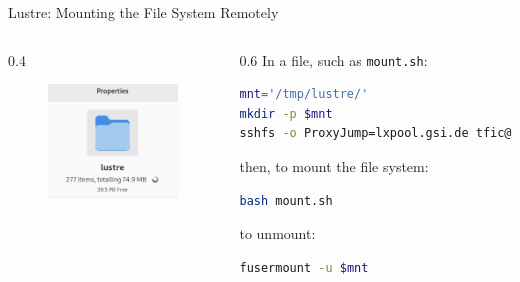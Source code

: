 \begin{frame}[fragile]{Lustre: Mounting the File System Remotely}
    \begin{columns}
        \begin{column}{0.4\textwidth}
            \begin{figure}
                \centering
                \includegraphics[width=\textwidth]{images/lustre_petabytes.png}
            \end{figure}
        \end{column}
        \begin{column}{0.6\textwidth}
            In a file, such as \texttt{mount.sh}:
            \begin{lstlisting}[language=bash]
mnt='/tmp/lustre/'
mkdir -p $mnt
sshfs -o ProxyJump=lxpool.gsi.de tfic@lustre.hpc.gsi.de:/lustre $mnt
            \end{lstlisting}
            then, to mount the file system:
            \begin{lstlisting}[language=bash]
bash mount.sh
            \end{lstlisting}
            to unmount:
            \begin{lstlisting}[language=bash]
fusermount -u $mnt
            \end{lstlisting}
        \end{column}
    \end{columns}
\end{frame}

